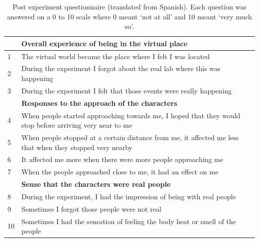 \documentclass[
		twoside,openright,titlepage,numbers=noenddot,manychapters,
		headinclude,%
                footinclude=false,cleardoublepage=empty,
                BCOR=5mm,
		fontsize=11pt, %
                 enabledeprecatedfontcommands]{scrreprt}
\begin{document}
\begin{table}[ht]
\caption{Post experiment questionnaire (translated from Spanish). Each question was answered on a 0 to 10 scale where 0 meant `not at all' and 10 meant `very much so'.}


\begin{tabular*}{1.00\textwidth}{ p{}  p{} }
\\
\hline\hline

 & \textbf{Overall experience of being in the virtual place} \\
  \hline
1 & The virtual world became the place where I felt I was located \\
2 & During the experiment I forgot about the real lab where this was happening \\
3 & During the experiment I felt that those events were really happening \\
 [1ex]
 & \textbf{Responses to the approach of the characters} \\ 
\hline
4 & When people started approaching towards me, I hoped that they  would stop before arriving very near to me \\
5 & When people stopped at a certain distance from me, it affected  me less that when they stopped very nearby \\ 
6 & It affected me more when there were more people approaching me \\
7 & When the people approached close to me, it had an effect on me \\
 [1ex]
 & \textbf{Sense that the characters were real people} \\ 
\hline
8 & During the experiment, I had the impression of being with real people \\
9 & Sometimes I forgot those people were not real \\
10 & Sometimes I had the sensation of feeling the body heat or smell of the people \\
[1ex]
\hline
\end{tabular*}

\label{table_question}
\end{table}
\end{document}
